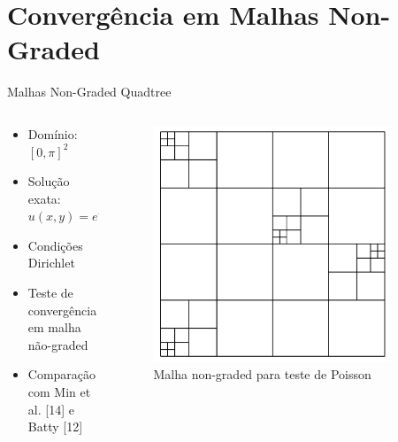 \documentclass[../main/main.tex]{subfiles}
\begin{document}
\section{Convergência em Malhas Non-Graded}

\begin{frame}{Malhas Non-Graded Quadtree}
\begin{columns}[T]
\begin{column}{0.5\textwidth}
\begin{itemize}
\item Domínio: $[0, \pi]^2$
\item Solução exata: $u(x, y) = e^{-x-y}$
\item Condições Dirichlet
\item Teste de convergência em malha não-graded
\item Comparação com Min et al. [14] e Batty [12]
\end{itemize}
\end{column}
\begin{column}{0.5\textwidth}
\begin{figure}
\centering
\includegraphics[width=0.9\textwidth]{imgs/figura5.png}
\caption{Malha non-graded para teste de Poisson}
\end{figure}
\end{column}
\end{columns}
\end{frame}
\end{document}
